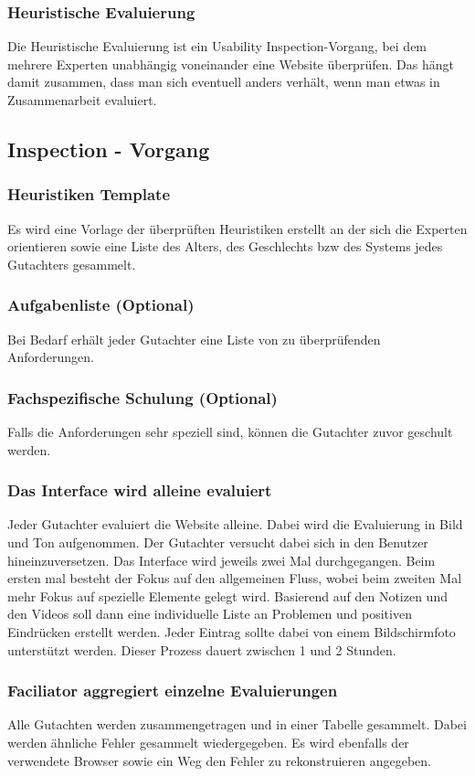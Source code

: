 \documentclass{article}
\begin{document}
	\subsubsection{Heuristische Evaluierung}
	Die Heuristische Evaluierung ist ein Usability Inspection-Vorgang, bei dem mehrere Experten unabhängig voneinander eine Website überprüfen. Das hängt damit zusammen, dass man sich eventuell anders verhält, wenn man etwas in Zusammenarbeit evaluiert.

	\subsection{Inspection - Vorgang}
	\subsubsection{Heuristiken Template}
	Es wird eine Vorlage der überprüften Heuristiken erstellt an der sich die Experten orientieren sowie eine Liste des Alters, des Geschlechts bzw des Systems jedes Gutachters gesammelt.
	\subsubsection{Aufgabenliste (Optional)}
	Bei Bedarf erhält jeder Gutachter eine Liste von zu überprüfenden Anforderungen.
	\subsubsection{Fachspezifische Schulung (Optional)}
	Falls die Anforderungen sehr speziell sind, können die Gutachter zuvor geschult werden.
	\subsubsection{Das Interface wird alleine evaluiert}
	Jeder Gutachter evaluiert die Website alleine. Dabei wird die Evaluierung in Bild und Ton aufgenommen. Der Gutachter versucht dabei sich in den Benutzer hineinzuversetzen. Das Interface wird jeweils zwei Mal durchgegangen. Beim ersten mal besteht der Fokus auf den allgemeinen Fluss, wobei beim zweiten Mal mehr Fokus auf spezielle Elemente gelegt wird. Basierend auf den Notizen und den Videos soll dann eine individuelle Liste an Problemen und positiven Eindrücken erstellt werden. Jeder Eintrag sollte dabei von einem Bildschirmfoto unterstützt werden. Dieser Prozess dauert zwischen 1 und 2 Stunden.
	\subsubsection{Faciliator aggregiert einzelne Evaluierungen}
	Alle Gutachten werden zusammengetragen und in einer Tabelle gesammelt. Dabei werden ähnliche Fehler gesammelt wiedergegeben. Es wird ebenfalls der verwendete Browser sowie ein Weg den Fehler zu rekonstruieren angegeben.
\end{document}
